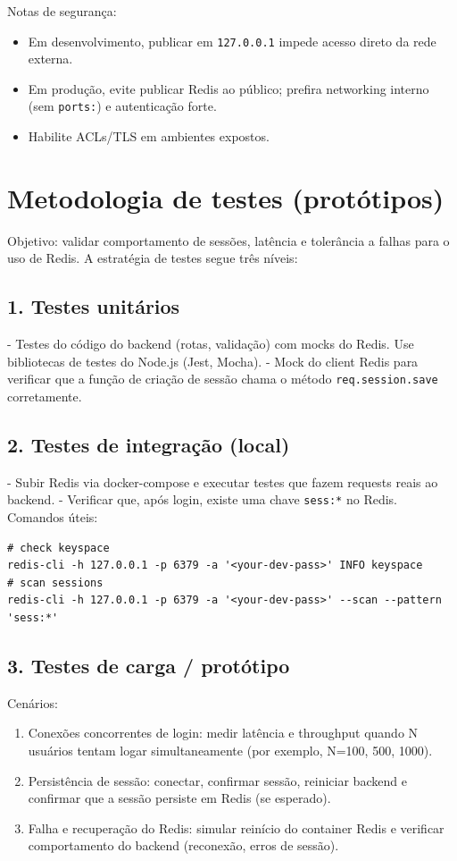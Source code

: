 \documentclass[a4paper,11pt]{article}
\begin{document}
Notas de segurança:
\begin{itemize}
  \item Em desenvolvimento, publicar em \texttt{127.0.0.1} impede acesso direto da rede externa.
  \item Em produção, evite publicar Redis ao público; prefira networking interno (sem \texttt{ports:}) e autenticação forte.
  \item Habilite ACLs/TLS em ambientes expostos.
\end{itemize}

\section{Metodologia de testes (protótipos)}
Objetivo: validar comportamento de sessões, latência e tolerância a falhas para o uso de Redis. A estratégia de testes segue três níveis:

\subsection*{1. Testes unitários}
- Testes do código do backend (rotas, validação) com mocks do Redis. Use bibliotecas de testes do Node.js (Jest, Mocha).
- Mock do client Redis para verificar que a função de criação de sessão chama o método \texttt{req.session.save} corretamente.

\subsection*{2. Testes de integração (local)}
- Subir Redis via docker-compose e executar testes que fazem requests reais ao backend.
- Verificar que, após login, existe uma chave \texttt{sess:*} no Redis. Comandos úteis:
\begin{lstlisting}
# check keyspace
redis-cli -h 127.0.0.1 -p 6379 -a '<your-dev-pass>' INFO keyspace
# scan sessions
redis-cli -h 127.0.0.1 -p 6379 -a '<your-dev-pass>' --scan --pattern 'sess:*'
\end{lstlisting}

\subsection*{3. Testes de carga / protótipo}
Cenários:
\begin{enumerate}[label=\arabic*)]
  \item Conexões concorrentes de login: medir latência e throughput quando N usuários tentam logar simultaneamente (por exemplo, N=100, 500, 1000).
  \item Persistência de sessão: conectar, confirmar sessão, reiniciar backend e confirmar que a sessão persiste em Redis (se esperado).
  \item Falha e recuperação do Redis: simular reinício do container Redis e verificar comportamento do backend (reconexão, erros de sessão).
\end{enumerate}
\end{document}

